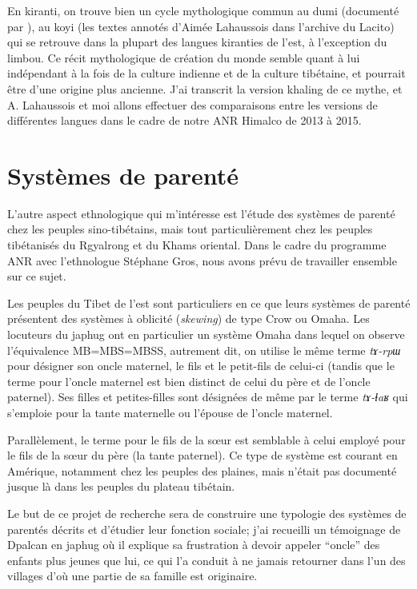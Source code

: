 \documentclass[oldfontcommands,oneside,a4paper,11pt]{memoir}
\begin{document}
En kiranti, on trouve bien un cycle mythologique commun au dumi (documenté par \citealt{driem93dumi}), au koyi (les textes annotés d'Aimée Lahaussois dans l'archive du Lacito)  qui se retrouve dans la plupart des langues kiranties de l'est, à l'exception du limbou. Ce récit mythologique de création du monde semble quant à lui indépendant à la fois de la culture indienne et de la culture tibétaine, et pourrait être d'une origine plus ancienne. J'ai transcrit la version khaling de ce mythe, et A. Lahaussois et moi allons effectuer des comparaisons entre les versions de différentes langues dans le cadre de notre ANR Himalco de 2013 à 2015.

 

\section{Systèmes de parenté}

L'autre aspect ethnologique qui m'intéresse est l'étude des systèmes de parenté chez les peuples sino-tibétains, mais tout particulièrement chez les peuples tibétanisés du Rgyalrong et du Khams oriental. Dans le cadre du programme ANR avec l'ethnologue Stéphane Gros, nous avons prévu de travailler ensemble sur ce sujet.

Les peuples du Tibet de l'est sont particuliers en ce que leurs systèmes de parenté présentent des systèmes à oblicité (\textit{skewing}) de type Crow ou Omaha. Les locuteurs du japhug ont en particulier un système Omaha dans lequel on observe l'équivalence MB=MBS=MBSS, autrement dit, on utilise le même terme \textit{tɤ-rpɯ} pour désigner son oncle maternel, le fils et le petit-fils de celui-ci (tandis que le terme pour l'oncle maternel est bien distinct de celui du père et de l'oncle paternel). Ses filles et petites-filles sont désignées de même par le terme \textit{tɤ-ɬaʁ} qui s'emploie pour la tante maternelle ou l'épouse de l'oncle maternel.

Parallèlement, le terme pour le fils de la sœur est semblable à celui employé pour le fils de la sœur du père (la tante paternel).  Ce type de système est courant en Amérique, notamment chez les peuples des plaines, mais n'était pas documenté jusque là dans les peuples du plateau tibétain.


Le but de ce projet de recherche sera de construire une typologie des systèmes de parentés décrits et d'étudier leur fonction sociale; j'ai recueilli un témoignage de Dpalcan en japhug où il explique sa frustration à devoir appeler ``oncle'' des enfants plus jeunes que lui, ce qui l'a conduit à ne jamais retourner dans l'un des villages d'où une partie de sa famille est originaire.
\end{document}
